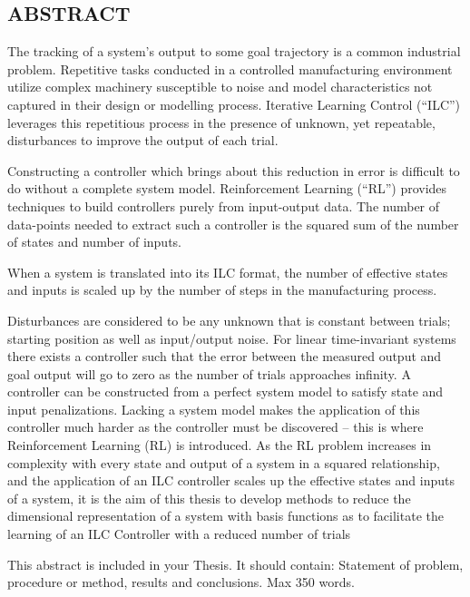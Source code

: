 \pagestyle{plain}
\begin{center}


\section*{ABSTRACT}


\end{center}

The tracking of a system's output to some goal trajectory is a common industrial problem. Repetitive tasks conducted in a controlled manufacturing environment utilize complex machinery susceptible to noise and model characteristics not captured in their design or modelling process. Iterative Learning Control (``ILC'') leverages this repetitious process in the presence of unknown, yet repeatable, disturbances to improve the output of each trial.

Constructing a controller which brings about this reduction in error is difficult to do without a complete system model. Reinforcement Learning (``RL'') provides techniques to build controllers purely from input-output data. The number of data-points needed to extract such a controller is the squared sum of the number of states and number of inputs.

When a system is translated into its ILC format, the number of effective states and inputs is scaled up by the number of steps in the manufacturing process.

Disturbances are considered to be any unknown that is constant between trials; starting position
as well as input/output noise. For linear time-invariant systems there exists a controller such that
the error between the measured output and goal output will go to zero as the number of trials
approaches infinity. A controller can be constructed from a perfect system model to satisfy state
and input penalizations. Lacking a system model makes the application of this controller much
harder as the controller must be discovered – this is where Reinforcement Learning (RL) is
introduced. As the RL problem increases in complexity with every state and output of a system in
a squared relationship, and the application of an ILC controller scales up the effective states and
inputs of a system, it is the aim of this thesis to develop methods to reduce the dimensional
representation of a system with basis functions as to facilitate the learning of an ILC Controller
with a reduced number of trials

This abstract is included in your Thesis.  It should contain: Statement of problem, procedure or method, results and conclusions.  Max 350 words.



\cleardoublepage%
